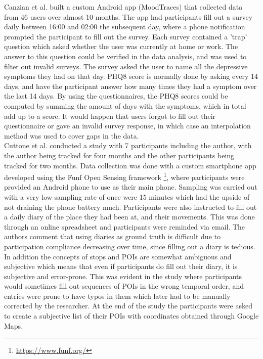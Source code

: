 Canzian et al. built a custom Android app (MoodTraces) that collected data from 46 users over almost 10 months. The app had participants fill out a survey daily between 16:00 and 02:00 the subsequent day, where a phone notification prompted the participant to fill out the survey. Each survey contained a 'trap' question which asked whether the user was currently at home or work. The answer to this question could be verified in the data analysis, and was used to filter out invalid surveys. The survey asked the user to name all the depressive symptoms they had on that day. PHQ8 score is normally done by asking every 14 days, and have the participant answer how many times they had a symptom over the last 14 days. By using the questionnaires, the PHQ8 scores could be computed by summing the amount of days with the symptoms, which in total add up to a score. It would happen that users forgot to fill out their questionnaire or gave an invalid survey response, in which case an interpolation method was used to cover gaps in the data.\\

Cuttone et al. conducted a study with 7 participants including the author, with the author being tracked for four months and the other participants being tracked for two months. Data collection was done with a custom smartphone app developed using the Funf Open Sensing framework \footnote{\url{https://www.funf.org/}}, where participants were provided an Android phone to use as their main phone. Sampling was carried out with a very low sampling rate of once were 15 minutes which had the upside of not draining the phone battery much. Participants were also instructed to fill out a daily diary of the place they had been at, and their movements. This was done through an online spreadsheet and participants were reminded via email. The authors comment that using diaries as ground truth is difficult due to participation compliance decreasing over time, since filling out a diary is tedious. In addition the concepts of stops and POIs are somewhat ambiguous and subjective which means that even if participants do fill out their diary, it is subjective and error-prone. This was evident in the study where participants would sometimes fill out sequences of POIs in the wrong temporal order, and entries were prone to have typos in them which later had to be manually corrected by the researcher. At the end of the study the participants were asked to create a subjective list of their POIs with coordinates obtained through Google Maps. \\

